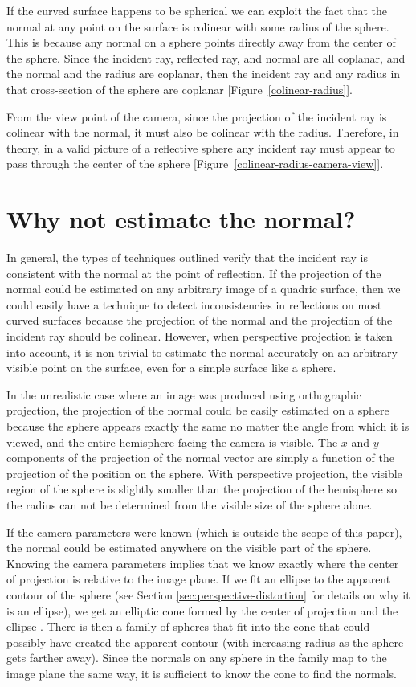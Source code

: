 \documentclass{thesis}
\begin{document}
If the curved surface happens to be spherical we can exploit the fact that the normal at any point on the surface is colinear with some radius of the sphere. This is because any normal on a sphere points directly away from the center of the sphere. Since the incident ray, reflected ray, and normal are all coplanar, and the normal and the radius are coplanar, then the incident ray and any radius in that cross-section of the sphere are coplanar [Figure~\ref{colinear-radius}].

From the view point of the camera, since the projection of the incident ray is colinear with the normal, it must also be colinear with the radius. Therefore, in theory, in a valid picture of a reflective sphere any incident ray must appear to pass through the center of the sphere [Figure~\ref{colinear-radius-camera-view}].

\section{Why not estimate the normal?}
\label{sec:normal-estimate}
In general, the types of techniques outlined verify that the incident ray is consistent with the normal at the point of reflection. If the projection of the normal could be estimated on any arbitrary image of a quadric surface, then we could easily have a technique to detect inconsistencies in reflections on most curved surfaces because the projection of the normal and the projection of the incident ray should be colinear. However, when perspective projection is taken into account, it is non-trivial to estimate the normal accurately on an arbitrary visible point on the surface, even for a simple surface like a sphere.

In the unrealistic case where an image was produced using orthographic projection, the projection of the normal could be easily estimated on a sphere because the sphere appears exactly the same no matter the angle from which it is viewed, and the entire hemisphere facing the camera is visible. The $x$ and $y$ components of the projection of the normal vector are simply a function of the projection of the position on the sphere. With perspective projection, the visible region of the sphere is slightly smaller than the projection of the hemisphere so the radius can not be determined from the visible size of the sphere alone.

If the camera parameters were known (which is outside the scope of this paper), the normal could be estimated anywhere on the visible part of the sphere. Knowing the camera parameters implies that we know exactly where the center of projection is relative to the image plane. If we fit an ellipse to the apparent contour of the sphere (see Section \ref{sec:perspective-distortion} for details on why it is an ellipse), we get an elliptic cone formed by the center of projection and the ellipse \cite[p. 201]{hartley}. There is then a family of spheres that fit into the cone that could possibly have created the apparent contour (with increasing radius as the sphere gets farther away). Since the normals on any sphere in the family map to the image plane the same way, it is sufficient to know the cone to find the normals.
\end{document}
